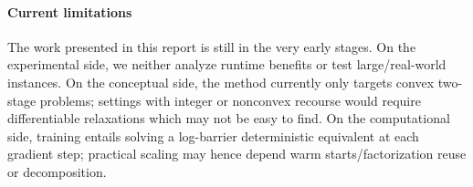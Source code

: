 \documentclass{article}
\begin{document}


\paragraph{Current limitations}The work presented in this report is still in the very early stages. 
On the experimental side, we neither analyze runtime benefits or test large/real-world instances. 
On the conceptual side, the method currently only targets convex two-stage problems; 
settings with integer or nonconvex recourse would require differentiable relaxations which may not be easy to find. 
On the computational side, training entails solving a log-barrier deterministic equivalent at each gradient step; practical scaling 
may hence depend warm starts/factorization reuse or decomposition. 

\nocite{*} %


\end{document}
